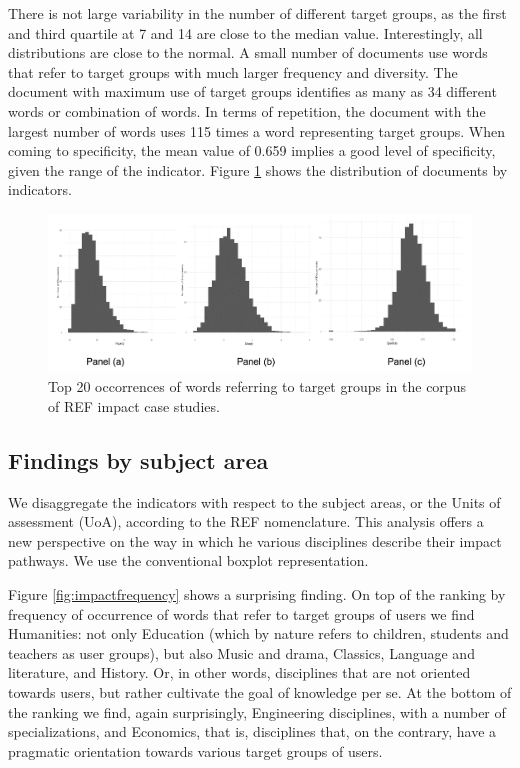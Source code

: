 \documentclass[]{book}
\theoremstyle{definition}
\theoremstyle{definition}
\theoremstyle{definition}
\theoremstyle{remark}
\begin{document}
There is not large variability in the number of different target groups,
as the first and third quartile at 7 and 14 are close to the median
value. Interestingly, all distributions are close to the normal. A small
number of documents use words that refer to target groups with much
larger frequency and diversity. The document with maximum use of target
groups identifies as many as 34 different words or combination of words.
In terms of repetition, the document with the largest number of words
uses 115 times a word representing target groups. When coming to
specificity, the mean value of 0.659 implies a good level of
specificity, given the range of the indicator. Figure
\ref{fig:impactusersfreqcomparison} shows the distribution of documents
by indicators.

\begin{figure}

{\centering \includegraphics[width=1\linewidth]{_bookdown_files/figures/impact_users_freq_comparison} 

}

\caption{Top 20 occorrences of words referring to target groups in the corpus of REF impact case studies.}\label{fig:impactusersfreqcomparison}
\end{figure}

\subsection{Findings by subject area}\label{findings-by-subject-area}

We disaggregate the indicators with respect to the subject areas, or the
Units of assessment (UoA), according to the REF nomenclature. This
analysis offers a new perspective on the way in which he various
disciplines describe their impact pathways. We use the conventional
boxplot representation.

Figure \ref{fig:impactfrequency} shows a surprising finding. On top of
the ranking by frequency of occurrence of words that refer to target
groups of users we find Humanities: not only Education (which by nature
refers to children, students and teachers as user groups), but also
Music and drama, Classics, Language and literature, and History. Or, in
other words, disciplines that are not oriented towards users, but rather
cultivate the goal of knowledge per se. At the bottom of the ranking we
find, again surprisingly, Engineering disciplines, with a number of
specializations, and Economics, that is, disciplines that, on the
contrary, have a pragmatic orientation towards various target groups of
users.
\end{document}
